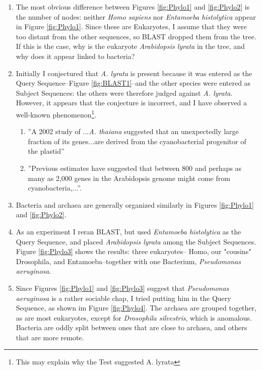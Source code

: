 \documentclass[]{article}
\begin{document}
\begin{enumerate}
	\item The most obvious difference between Figures \ref{fig:Phylo1} and  \ref{fig:Phylo2} is the number of nodes: neither \textit{Homo sapiens} nor \textit{Entamoeba histolytica} appear in Figure \ref{fig:Phylo1}. Since these are Eukaryotes, I assume that they were too distant from the other sequences, so BLAST dropped them from the tree. If this is the case, why is the eukaryote \textit{Arabidopsis lyrata} in the tree, and why does it appear linked to bacteria?
	\item Initially I conjectured that \textit{A. lyrata} is present because it was entered as the Query Sequence--Figure \ref{fig:BLAST1}--and the other species were entered as Subject Sequences: the others were therefore judged against \textit{A. lyrata}. However, it appears that the conjecture is incorrect, and I have observed a well-known phenomenon\footnote{This may explain why the Test suggested A. lyrata}.
	
	\begin{enumerate}
		\item  ''A 2002 study of ...\textit{A. thaiana} suggested that an unexpectedly large fraction of its genes...are derived from the cyanobacterial progenitor of the plastid\cite{lane2008eukaryotic}''
		\item ''Previous estimates have suggested that between 800 and perhaps as many as 2,000 genes in the Arabidopsis genome might come from cyanobacteria,...''.\cite{martin2002evolutionary}
	\end{enumerate} 
	\item Bacteria and archaea are generally organized similarly in  Figures \ref{fig:Phylo1} and  \ref{fig:Phylo2}.
	\item As an experiment I reran BLAST, but used \textit{Entamoeba histolytica } as the Query Sequence, and placed \textit{Arabidopsis lyrata} among the Subject Sequences. Figure \ref{fig:Phylo3} shows the results: three eukaryotes-- Homo, our "cousins" Drosophila, and Entamoeba--together with one Bacterium, \textit{Pseudomonas aeruginosa}. 
	\item Since Figures \ref{fig:Phylo1} and \ref{fig:Phylo3} suggest that \textit{Pseudomonas aeruginosa} is a rather sociable chap, I tried putting him in the Query Sequence, as shown im Figure \ref{fig:Phylo4}. The archaea are grouped together, as are most eukaryotes, except for \textit{Drosophila silvestris}, which is anomalous. Bacteria are oddly split between ones that are close to archaea, and others that are more remote.
\end{enumerate}
\end{document}
